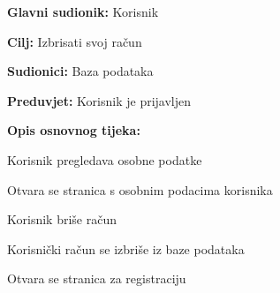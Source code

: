 					\noindent {}
					\begin{packed_item}
	
						\item \textbf{Glavni sudionik: }Korisnik
						\item  \textbf{Cilj:} Izbrisati svoj račun
						\item  \textbf{Sudionici:} Baza podataka
						\item  \textbf{Preduvjet:} Korisnik je prijavljen
						\item  \textbf{Opis osnovnog tijeka:}
						
						\item[] \begin{packed_enum}
	
							\item Korisnik pregledava osobne podatke
							\item Otvara se stranica s osobnim podacima korisnika
							\item Korisnik briše račun
							\item Korisnički račun se izbriše iz baze podataka
							\item Otvara se stranica za registraciju

						\end{packed_enum}
				
					\end{packed_item}
					
